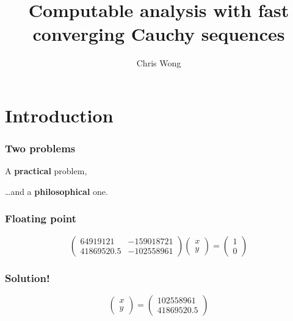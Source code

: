\documentclass{beamer}
\begin{document}
\title{Computable analysis with fast converging Cauchy sequences}
\author{Chris Wong}

\frame{\titlepage}

\setlength{\parskip}{\baselineskip}

\section{Introduction}
\begin{frame}
    \frametitle{Two problems}

    A \textbf{practical} problem,

    \vfill

    \hfill \ldots and a \textbf{philosophical} one.

\end{frame}

\begin{frame}
    \frametitle{Floating point}

    \[
        \begin{pmatrix}
            64919121 & -159018721 \\
            41869520.5 & -102558961
        \end{pmatrix}
        \begin{pmatrix}
            x \\ y
        \end{pmatrix}
        =
        \begin{pmatrix}
            1 \\ 0
        \end{pmatrix}
    \]

\end{frame}

\begin{frame}
    \frametitle{Solution!}

    \[
        \begin{pmatrix}
            x \\ y
        \end{pmatrix}
        =
        \begin{pmatrix}
            102558961 \\ 41869520.5
        \end{pmatrix}
    \]

\end{frame}
\end{document}
